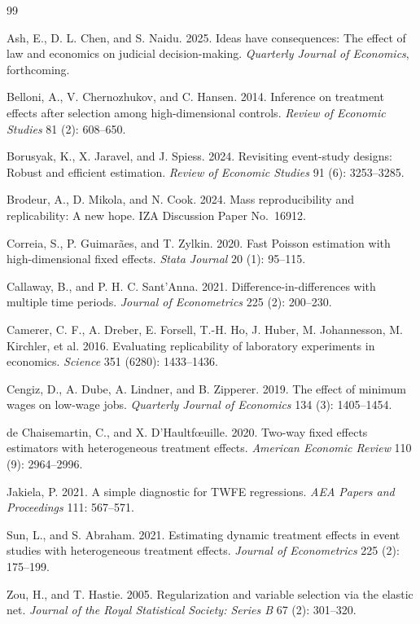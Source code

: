 \documentclass[12pt,a4paper]{article}
\begin{document}
\begin{thebibliography}{99}

Ash, E., D. L. Chen, and S. Naidu. 2025.
\newblock Ideas have consequences: The effect of law and economics on judicial decision-making.
\newblock \textit{Quarterly Journal of Economics}, forthcoming.

Belloni, A., V. Chernozhukov, and C. Hansen. 2014.
\newblock Inference on treatment effects after selection among high-dimensional controls.
\newblock \textit{Review of Economic Studies} 81 (2): 608--650.

Borusyak, K., X. Jaravel, and J. Spiess. 2024.
\newblock Revisiting event-study designs: Robust and efficient estimation.
\newblock \textit{Review of Economic Studies} 91 (6): 3253--3285.

Brodeur, A., D. Mikola, and N. Cook. 2024.
\newblock Mass reproducibility and replicability: A new hope.
\newblock IZA Discussion Paper No.\ 16912.

Correia, S., P. Guimar\~aes, and T. Zylkin. 2020.
\newblock Fast Poisson estimation with high-dimensional fixed effects.
\newblock \textit{Stata Journal} 20 (1): 95--115.

Callaway, B., and P. H. C. Sant'Anna. 2021.
\newblock Difference-in-differences with multiple time periods.
\newblock \textit{Journal of Econometrics} 225 (2): 200--230.

Camerer, C. F., A. Dreber, E. Forsell, T.-H. Ho, J. Huber, M. Johannesson, M. Kirchler, et al. 2016.
\newblock Evaluating replicability of laboratory experiments in economics.
\newblock \textit{Science} 351 (6280): 1433--1436.

Cengiz, D., A. Dube, A. Lindner, and B. Zipperer. 2019.
\newblock The effect of minimum wages on low-wage jobs.
\newblock \textit{Quarterly Journal of Economics} 134 (3): 1405--1454.

de Chaisemartin, C., and X. D'Haultf{\oe}uille. 2020.
\newblock Two-way fixed effects estimators with heterogeneous treatment effects.
\newblock \textit{American Economic Review} 110 (9): 2964--2996.

Jakiela, P. 2021.
\newblock A simple diagnostic for TWFE regressions.
\newblock \textit{AEA Papers and Proceedings} 111: 567--571.

Sun, L., and S. Abraham. 2021.
\newblock Estimating dynamic treatment effects in event studies with heterogeneous treatment effects.
\newblock \textit{Journal of Econometrics} 225 (2): 175--199.

Zou, H., and T. Hastie. 2005.
\newblock Regularization and variable selection via the elastic net.
\newblock \textit{Journal of the Royal Statistical Society: Series B} 67 (2): 301--320.

\end{thebibliography}
\end{document}
